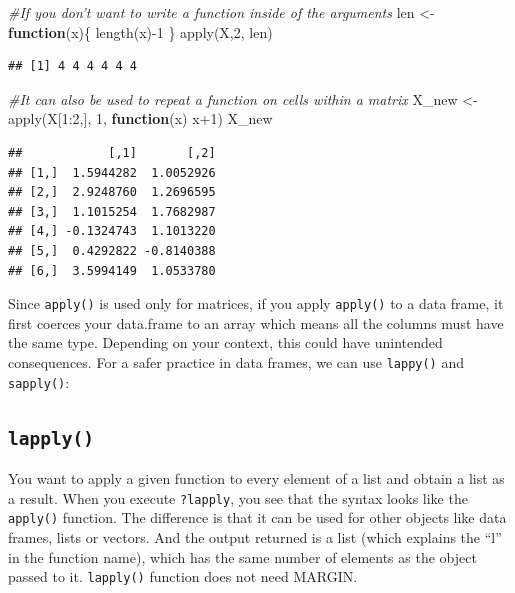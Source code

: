 \documentclass[
]{book}
\newenvironment{Shaded}{\begin{snugshade}}{\end{snugshade}}
\newcommand{\CommentTok}[1]{\textcolor[rgb]{0.56,0.35,0.01}{\textit{#1}}}
\newcommand{\ControlFlowTok}[1]{\textcolor[rgb]{0.13,0.29,0.53}{\textbf{#1}}}
\newcommand{\DecValTok}[1]{\textcolor[rgb]{0.00,0.00,0.81}{#1}}
\newcommand{\FunctionTok}[1]{\textcolor[rgb]{0.00,0.00,0.00}{#1}}
\newcommand{\NormalTok}[1]{#1}
\newcommand{\OtherTok}[1]{\textcolor[rgb]{0.56,0.35,0.01}{#1}}
\newcommand{\SpecialCharTok}[1]{\textcolor[rgb]{0.00,0.00,0.00}{#1}}
\begin{document}
\begin{Shaded}
\begin{Highlighting}[]
\CommentTok{\#If you don’t want to write a function inside of the arguments}
\NormalTok{len }\OtherTok{\textless{}{-}} \ControlFlowTok{function}\NormalTok{(x)\{}
  \FunctionTok{length}\NormalTok{(x)}\SpecialCharTok{{-}}\DecValTok{1}
\NormalTok{\}}
\FunctionTok{apply}\NormalTok{(X,}\DecValTok{2}\NormalTok{, len)}
\end{Highlighting}
\end{Shaded}

\begin{verbatim}
## [1] 4 4 4 4 4 4
\end{verbatim}

\begin{Shaded}
\begin{Highlighting}[]
\CommentTok{\#It can also be used to repeat a function on cells within a matrix}
\NormalTok{X\_new }\OtherTok{\textless{}{-}} \FunctionTok{apply}\NormalTok{(X[}\DecValTok{1}\SpecialCharTok{:}\DecValTok{2}\NormalTok{,], }\DecValTok{1}\NormalTok{, }\ControlFlowTok{function}\NormalTok{(x) x}\SpecialCharTok{+}\DecValTok{1}\NormalTok{)}
\NormalTok{X\_new}
\end{Highlighting}
\end{Shaded}

\begin{verbatim}
##            [,1]       [,2]
## [1,]  1.5944282  1.0052926
## [2,]  2.9248760  1.2696595
## [3,]  1.1015254  1.7682987
## [4,] -0.1324743  1.1013220
## [5,]  0.4292822 -0.8140388
## [6,]  3.5994149  1.0533780
\end{verbatim}

Since \texttt{apply()} is used only for matrices, if you apply \texttt{apply()} to a data frame, it first coerces your data.frame to an array which means all the columns must have the same type. Depending on your context, this could have unintended consequences. For a safer practice in data frames, we can use \texttt{lappy()} and \texttt{sapply()}:

\hypertarget{lapply}{%
\subsection{\texorpdfstring{\texttt{lapply()}}{lapply()}}\label{lapply}}

You want to apply a given function to every element of a list and obtain a list as a result. When you execute \texttt{?lapply}, you see that the syntax looks like the \texttt{apply()} function. The difference is that it can be used for other objects like data frames, lists or vectors. And the output returned is a list (which explains the ``l'' in the function name), which has the same number of elements as the object passed to it. \texttt{lapply()} function does not need MARGIN.
\end{document}
